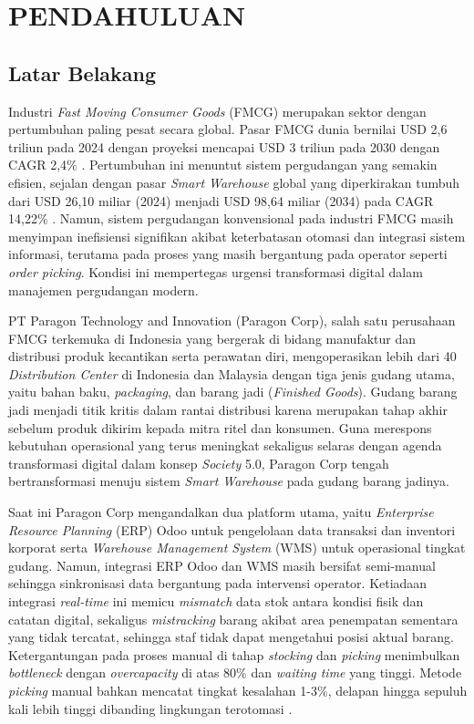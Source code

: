 \cleardoublepage %
\chapter{PENDAHULUAN}
\label{chap:pendahuluan}

\section{Latar Belakang}
Industri \textit{Fast Moving Consumer Goods} (FMCG) merupakan sektor dengan pertumbuhan paling pesat secara global. Pasar FMCG dunia bernilai USD 2,6 triliun pada 2024 dengan proyeksi mencapai USD 3 triliun pada 2030 dengan CAGR 2,4\% \autocite{researchandmarkets2025}. Pertumbuhan ini menuntut sistem pergudangan yang semakin efisien, sejalan dengan pasar \textit{Smart Warehouse} global yang diperkirakan tumbuh dari USD 26,10 miliar (2024) menjadi USD 98,64 miliar (2034) pada CAGR 14,22\% \autocite{precedenceresearch2025}. Namun, sistem pergudangan konvensional pada industri FMCG masih menyimpan inefisiensi signifikan akibat keterbatasan otomasi dan integrasi sistem informasi, terutama pada proses yang masih bergantung pada operator seperti \textit{order picking}. Kondisi ini mempertegas urgensi transformasi digital dalam manajemen pergudangan modern.

PT Paragon Technology and Innovation (Paragon Corp), salah satu perusahaan FMCG terkemuka di Indonesia yang bergerak di bidang manufaktur dan distribusi produk kecantikan serta perawatan diri, mengoperasikan lebih dari 40 \textit{Distribution Center} di Indonesia dan Malaysia dengan tiga jenis gudang utama, yaitu bahan baku, \textit{packaging}, dan barang jadi (\textit{Finished Goods}). Gudang barang jadi menjadi titik kritis dalam rantai distribusi karena merupakan tahap akhir sebelum produk dikirim kepada mitra ritel dan konsumen. Guna merespons kebutuhan operasional yang terus meningkat sekaligus selaras dengan agenda transformasi digital dalam konsep \textit{Society} 5.0, Paragon Corp tengah bertransformasi menuju sistem \textit{Smart Warehouse} pada gudang barang jadinya.

Saat ini Paragon Corp mengandalkan dua platform utama, yaitu \textit{Enterprise Resource Planning} (ERP) Odoo untuk pengelolaan data transaksi dan inventori korporat serta \textit{Warehouse Management System} (WMS) untuk operasional tingkat gudang. Namun, integrasi ERP Odoo dan WMS masih bersifat semi-manual sehingga sinkronisasi data bergantung pada intervensi operator. Ketiadaan integrasi \textit{real-time} ini memicu \textit{mismatch} data stok antara kondisi fisik dan catatan digital, sekaligus \textit{mistracking} barang akibat area penempatan sementara yang tidak tercatat, sehingga staf tidak dapat mengetahui posisi aktual barang. Ketergantungan pada proses manual di tahap \textit{stocking} dan \textit{picking} menimbulkan \textit{bottleneck} dengan \textit{overcapacity} di atas 80\% dan \textit{waiting time} yang tinggi. Metode \textit{picking} manual bahkan mencatat tingkat kesalahan 1-3\%, delapan hingga sepuluh kali lebih tinggi dibanding lingkungan terotomasi \autocite{netsuite2024}.

